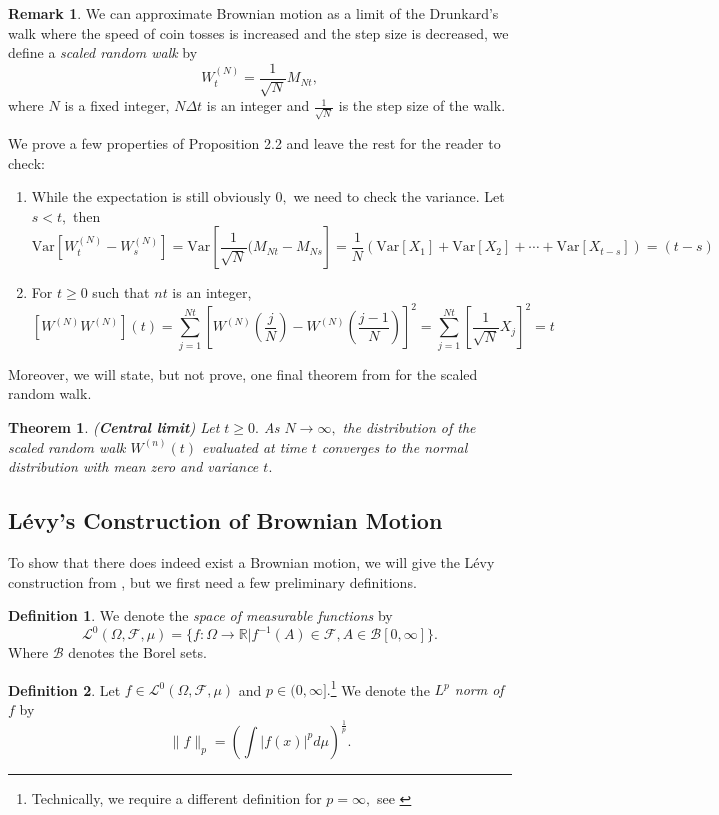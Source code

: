 \documentclass[openany, amssymb, psamsfonts]{amsart}
\newtheorem{thm}{Theorem}[section]
\theoremstyle{definition}
\newtheorem{defn}{Definition}[section]
\newtheorem{rem}{Remark}[section]
\numberwithin{equation}{section}
\newcommand{\bbR}{\mathbb{R}}
\newcommand{\Var}{\text{Var}}
\newcommand{\norm}[1]{\lVert #1 \rVert}
\begin{document}
\begin{rem} %
We can approximate Brownian motion as a limit of the Drunkard's walk where the speed of coin tosses is increased and the step size is decreased, we  define a \textit{scaled random walk} by \[W^{(N)}_{t} = \frac{1}{\sqrt{N}}M_{Nt},\] where $N$ is a fixed integer, $N\Delta t$ is an integer and $\frac{1}{\sqrt{N}}$ is the step size of the walk. 


We prove a few properties of Proposition 2.2 and leave the rest for the reader to check: 
\begin{enumerate}
    \item While the expectation is still obviously $0,$ we need to check the variance. Let $s<t,$ then
        \[\Var[W^{(N)}_{t} - W^{(N)}_{s}] = \Var[\frac{1}{\sqrt{N}}(M_{Nt} - M_{Ns}] = \frac{1}{N}(\Var[X_1] + \Var[X_2] + \cdots + \Var[X_{t-s}]) = (t-s)\]
    \item For $t\geq 0$ such that $nt$ is an integer,
    \[[W^{(N)} W^{(N)}](t) = \sum_{j=1}^{Nt} \left[W^{(N)}\left(\frac{j}{N}\right) - W^{(N)}\left(\frac{j-1}{N}\right)\right]^2 = \sum_{j=1}^{Nt} \left[\frac{1}{\sqrt{N}}X_j\right]^2 = t\]
\end{enumerate}
Moreover, we will state, but not prove, one final theorem from \cite{Shreve} for the scaled random walk.
\begin{thm}
(\textbf{Central limit}) Let $t\geq 0.$ As $N\to \infty,$ the distribution of the scaled random walk $W^{(n)}(t)$ evaluated at time $t$ converges to the normal distribution with mean zero and variance $t.$
\end{thm}
\end{rem}

\subsection{Lévy’s Construction of Brownian Motion}
To show that there does indeed exist a Brownian motion, we will give the Lévy construction from \cite{SCA}, but we first need a few preliminary definitions.


\begin{defn}
We denote the \textit{space of measurable functions} by 
\[\mathcal{L}^0(\Omega, \mathcal{F}, \mu) = \{f: \Omega \to \bbR | f^{-1}(A) \in \mathcal{F}, A\in \mathcal{B}[0,\infty]\}.\] Where $\mathcal{B}$ denotes the Borel sets. 
\end{defn}

\begin{defn}
Let $f \in \mathcal{L}^0(\Omega, \mathcal{F}, \mu)$ and $p\in (0,\infty].$\footnote{Technically, we require a different definition for $p = \infty,$ see \cite{SCA}} We denote the \textit{$L^p$ norm of $f$} by 
\[\norm{f}_p = \left(\int |f(x)|^p d\mu \right)^\frac{1}{p}.\]
\end{defn}
\end{document}
